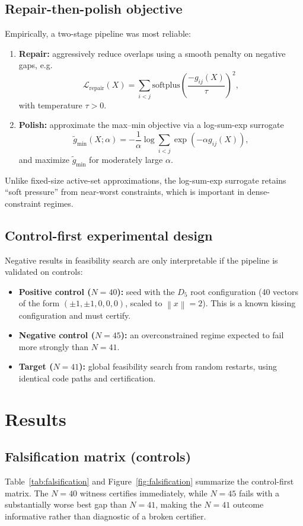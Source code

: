 \documentclass[11pt]{article}
\newcommand{\norm}[1]{\left\lVert #1 \right\rVert}
\begin{document}
\subsection{Repair-then-polish objective}
Empirically, a two-stage pipeline was most reliable:
\begin{enumerate}
\item \textbf{Repair:} aggressively reduce overlaps using a smooth penalty on negative gaps, e.g.
\[
\mathcal{L}_{\text{repair}}(X)=\sum_{i<j}\mathrm{softplus}\!\left(\frac{-g_{ij}(X)}{\tau}\right)^2,
\]
with temperature $\tau>0$.
\item \textbf{Polish:} approximate the max--min objective via a log-sum-exp surrogate
\[
\tilde g_{\min}(X;\alpha) = -\frac{1}{\alpha}\log\sum_{i<j}\exp(-\alpha g_{ij}(X)),
\]
and maximize $\tilde g_{\min}$ for moderately large $\alpha$.
\end{enumerate}
Unlike fixed-size active-set approximations, the log-sum-exp surrogate retains ``soft pressure'' from near-worst constraints, which is important in dense-constraint regimes.

\subsection{Control-first experimental design}
Negative results in feasibility search are only interpretable if the pipeline is validated on controls:
\begin{itemize}
\item \textbf{Positive control ($N=40$):} seed with the $D_5$ root configuration (40 vectors of the form $(\pm1,\pm1,0,0,0)$, scaled to $\norm{x}=2$). This is a known kissing configuration and must certify.
\item \textbf{Negative control ($N=45$):} an overconstrained regime expected to fail more strongly than $N=41$.
\item \textbf{Target ($N=41$):} global feasibility search from random restarts, using identical code paths and certification.
\end{itemize}

\section{Results}
\subsection{Falsification matrix (controls)}
Table~\ref{tab:falsification} and Figure~\ref{fig:falsification} summarize the control-first matrix. The $N=40$ witness certifies immediately, while $N=45$ fails with a substantially worse best gap than $N=41$, making the $N=41$ outcome informative rather than diagnostic of a broken certifier.
\end{document}
